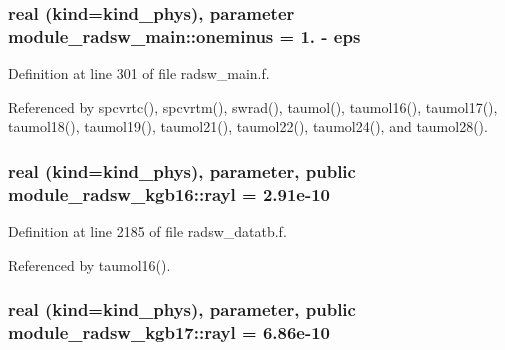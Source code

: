 \subsubsection[{\texorpdfstring{oneminus}{oneminus}}]{\setlength{\rightskip}{0pt plus 5cm}real (kind=kind\+\_\+phys), parameter module\+\_\+radsw\+\_\+main\+::oneminus = 1. -\/ eps\hspace{0.3cm}{\ttfamily [private]}}\hypertarget{group__module__radsw__main_gac666738c31ea648cae506a47e5a4e43d}{}\label{group__module__radsw__main_gac666738c31ea648cae506a47e5a4e43d}


Definition at line 301 of file radsw\+\_\+main.\+f.



Referenced by spcvrtc(), spcvrtm(), swrad(), taumol(), taumol16(), taumol17(), taumol18(), taumol19(), taumol21(), taumol22(), taumol24(), and taumol28().

\subsubsection[{\texorpdfstring{rayl}{rayl}}]{\setlength{\rightskip}{0pt plus 5cm}real (kind=kind\+\_\+phys), parameter, public module\+\_\+radsw\+\_\+kgb16\+::rayl = 2.\+91e-\/10}\hypertarget{group__module__radsw__main_ga27964e0300eb686acf1ed3c8459d3810}{}\label{group__module__radsw__main_ga27964e0300eb686acf1ed3c8459d3810}


Definition at line 2185 of file radsw\+\_\+datatb.\+f.



Referenced by taumol16().

\subsubsection[{\texorpdfstring{rayl}{rayl}}]{\setlength{\rightskip}{0pt plus 5cm}real (kind=kind\+\_\+phys), parameter, public module\+\_\+radsw\+\_\+kgb17\+::rayl = 6.\+86e-\/10}\hypertarget{group__module__radsw__main_gaa4862628a06e0e08d1db5637bc62ffa5}{}\label{group__module__radsw__main_gaa4862628a06e0e08d1db5637bc62ffa5}


